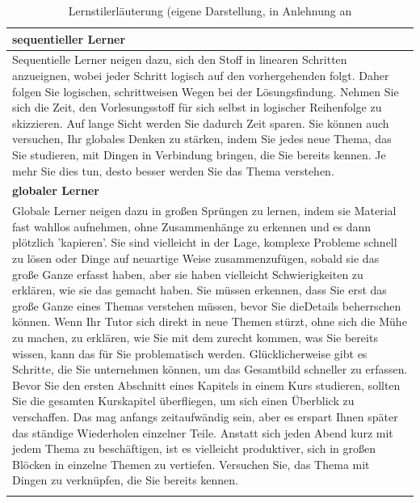 \begin{longtable}{|m{15cm}|}
  \centering \arraybackslash \textbf{sequentieller Lerner}  \\ 
  \hline \hline 
  Sequentielle Lerner neigen dazu, sich den Stoff in linearen Schritten anzueignen,
  wobei jeder Schritt logisch auf den vorhergehenden folgt. Daher folgen Sie logischen,
  schrittweisen Wegen bei der Lösungsfindung. Nehmen  Sie sich die Zeit, den
  Vorlesungsstoff für sich selbst in logischer Reihenfolge zu  skizzieren. Auf lange Sicht
  werden Sie dadurch Zeit sparen. Sie können auch versuchen, Ihr globales Denken zu
  stärken, indem Sie jedes neue Thema, das Sie studieren, mit Dingen in Verbindung
  bringen, die Sie bereits kennen. Je mehr Sie dies tun, desto besser werden Sie das Thema verstehen. \\ \hline
  \hline   
  \rowcolor[HTML]{EFEFEF}                                         
  
  \centering \arraybackslash \textbf{globaler Lerner}  \\ 
  \hline \hline 
  Globale Lerner neigen dazu in großen Sprüngen zu lernen, indem sie Material fast
  wahllos aufnehmen, ohne Zusammenhänge zu erkennen und es dann plötzlich
  'kapieren'. Sie sind vielleicht in der Lage, komplexe Probleme schnell zu lösen
  oder Dinge auf neuartige Weise zusammenzufügen, sobald sie das große Ganze
  erfasst haben, aber sie haben vielleicht Schwierigkeiten zu erklären, wie sie das
  gemacht haben. Sie müssen erkennen, dass Sie erst das große Ganze eines Themas
  verstehen müssen, bevor Sie dieDetails beherrschen können. Wenn Ihr Tutor sich
  direkt in neue Themen stürzt, ohne sich die Mühe zu machen, zu erklären, wie Sie
  mit dem zurecht kommen, was Sie bereits wissen, kann das für Sie problematisch 
  werden. Glücklicherweise gibt es Schritte, die Sie unternehmen können, um das
  Gesamtbild schneller zu erfassen. Bevor Sie den ersten Abschnitt eines Kapitels
  in einem Kurs studieren, sollten Sie die gesamten Kurskapitel überfliegen, um sich
  einen Überblick zu verschaffen. Das mag anfangs zeitaufwändig sein, aber es
  erspart Ihnen später das ständige Wiederholen einzelner Teile. Anstatt sich jeden
  Abend kurz mit jedem Thema zu beschäftigen, ist es vielleicht produktiver,
  sich in großen Blöcken in einzelne Themen zu vertiefen. Versuchen Sie, das 
  Thema mit Dingen zu verknüpfen, die Sie bereits kennen. \\ \hline
  \caption[Lernstilerläuterung]{Lernstilerläuterung (eigene Darstellung, in Anlehnung an \parencite{FelderSoloman} } 

\end{longtable}
\endgroup  


